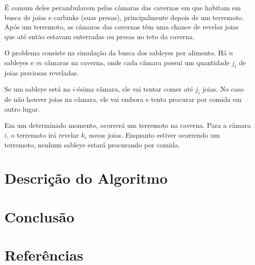 \documentclass{article}
\begin{document}
É comum deles perambularem pelas câmaras das cavernas em que habitam em busca de joias e carbinks (suas presas), principalmente depois de um terremoto. Após um terremoto, as câmaras das cavernas têm uma chance de revelar joias que até então estavam enterradas ou presas no teto da caverna.

O problema consiste na simulação da busca dos sableyes por alimento. Há $n$ sableyes e $m$ câmaras na caverna, onde cada câmara possui um quantidade $j_i$ de joias preciosas reveladas.

Se um sableye está na $i$-ésima câmara, ele vai tentar comer até $j_i$ joias. No caso de não houver joias na câmara, ele vai embora e tenta procurar por comida em outro lugar.

Em um determinado momento, ocorrerá um terremoto na caverna. Para a câmara $i$, o terremoto irá revelar $k_i$ novas joias. Enquanto estiver ocorrendo um terremoto, nenhum sableye estará procurando por comida.

\section{Descrição do Algoritmo}

\section{Conclusão}

\section{Referências}
\end{document}
